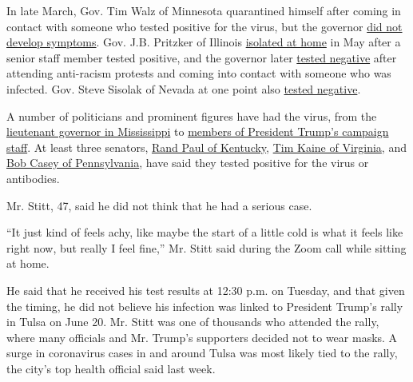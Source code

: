 In late March, Gov. Tim Walz of Minnesota quarantined himself after
coming in contact with someone who tested positive for the virus, but
the governor
\href{https://minnesota.cbslocal.com/2020/04/06/coronavirus-in-minnesota-gov-tim-walz-no-longer-under-self-quarantine/}{did
not develop symptoms}. Gov. J.B. Pritzker of Illinois
\href{https://www.chicagotribune.com/coronavirus/ct-coronavirus-jb-pritzker-staff-20200511-pc2b5w74jvehfp7aisew7d42rm-story.html}{isolated
at home} in May after a senior staff member tested positive, and the
governor later
\href{https://www.facebookcorewwwi.onion/GovPritzker/posts/after-attending-recent-protests-and-coming-into-contact-with-someone-who-tested-/3183920535055618/}{tested
negative} after attending anti-racism protests and coming into contact
with someone who was infected. Gov. Steve Sisolak of Nevada at one point
also
\href{https://www.reviewjournal.com/local/local-nevada/nevada-gov-steve-sisolak-tests-negative-for-coronavirus-2037303/}{tested
negative}.

A number of politicians and prominent figures have had the virus, from
the
\href{https://www.clarionledger.com/story/news/politics/2020/07/07/mississippi-coronavirus-lt-gov-delbert-hosemann-tests-positive/5391032002/}{lieutenant
governor in Mississippi} to
\href{https://www.nytimes3xbfgragh.onion/2020/06/22/us/politics/trump-campaign-coronavirus-tulsa.html}{members
of President Trump's campaign staff}. At least three senators,
\href{https://www.nytimes3xbfgragh.onion/2020/03/22/us/politics/coronavirus-rand-paul.html}{Rand
Paul of Kentucky},
\href{https://www.kaine.senate.gov/press-releases/kaine-statement-on-coronavirus-antibody-test-results}{Tim
Kaine of Virginia}, and
\href{https://www.politico.com/news/2020/05/29/bob-casey-tests-positive-coronavirus-antibodies-288843}{Bob
Casey of Pennsylvania}, have said they tested positive for the virus or
antibodies.

Mr. Stitt, 47, said he did not think that he had a serious case.

``It just kind of feels achy, like maybe the start of a little cold is
what it feels like right now, but really I feel fine,'' Mr. Stitt said
during the Zoom call while sitting at home.

He said that he received his test results at 12:30 p.m. on Tuesday, and
that given the timing, he did not believe his infection was linked to
President Trump's rally in Tulsa on June 20. Mr. Stitt was one of
thousands who attended the rally, where many officials and Mr. Trump's
supporters decided not to wear masks. A surge in coronavirus cases in
and around Tulsa was most likely tied to the rally, the city's top
health official said last week.

